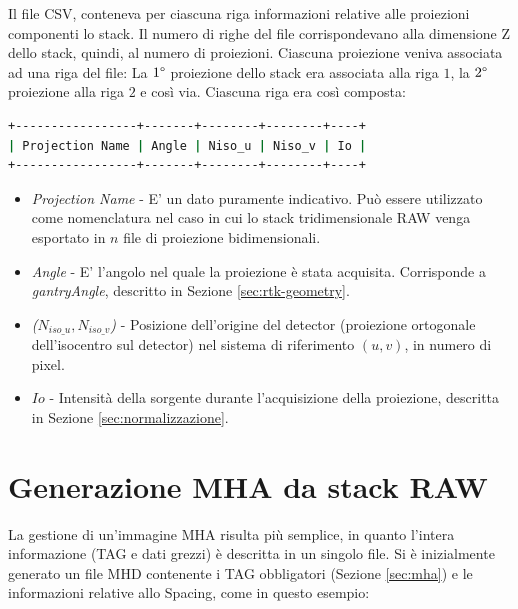 \documentclass[a4paper,12pt, doubleside]{report}
\begin{document}
            \bigskip    
            \par
                Il file CSV, conteneva per ciascuna riga informazioni relative alle proiezioni componenti lo stack. Il numero di righe del file corrispondevano alla dimensione Z dello stack, quindi, al numero di proiezioni. Ciascuna proiezione veniva associata ad una riga del file: La $1\degree$ proiezione dello stack era associata alla riga $1$, la $2\degree$ proiezione alla riga $2$ e così via. Ciascuna riga era così composta: 
                    
                \begin{lstlisting}[language=bash, frame=bt] 
+-----------------+-------+--------+--------+----+
| Projection Name | Angle | Niso_u | Niso_v | Io |
+-----------------+-------+--------+--------+----+
                \end{lstlisting}
                    
                \begin{itemize}
                    \item \textit{Projection Name} - E' un dato puramente indicativo. Può essere utilizzato come nomenclatura nel caso in cui lo stack tridimensionale RAW venga esportato in $n$ file di proiezione bidimensionali.
                        
                    \item \textit{Angle} - E' l'angolo nel quale la proiezione è stata acquisita. Corrisponde a \textit{gantryAngle}, descritto in Sezione \ref{sec:rtk-geometry}.
                        
                    \item \textit{($N_{iso\_u},N_{iso\_v}$)} - Posizione dell'origine del detector (proiezione ortogonale dell'isocentro sul detector) nel sistema di riferimento $(u,v)$, in numero di pixel.
                        
                    \item \textit{$Io$} - Intensità della sorgente durante l'acquisizione della proiezione, descritta in Sezione \ref{sec:normalizzazione}.
                \end{itemize}
                
            
        \section{Generazione MHA da stack RAW}
            \label{sec:conversione}
            \par
                La gestione di un'immagine MHA risulta più semplice, in quanto l'intera informazione (TAG e dati grezzi) è descritta in un singolo file. Si è inizialmente generato un file MHD contenente i TAG obbligatori (Sezione \ref{sec:mha}) e le informazioni relative allo Spacing, come in questo esempio:
                    
\end{document}
